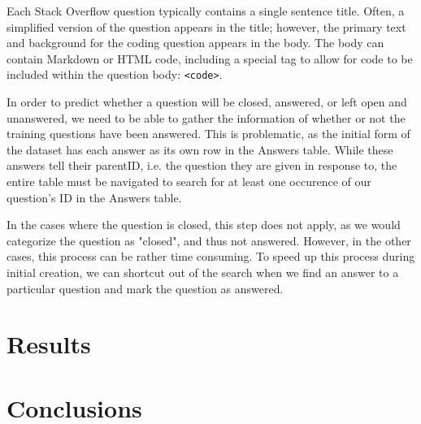 \documentclass{article}
\begin{document}
Each Stack Overflow question typically contains a single sentence title. 
Often, a simplified version of the question appears in the title; however,
the primary text and background for the coding question appears in the body.
The body can contain Markdown or HTML code, including a special tag to allow
for code to be included within the question body: {\tt <code>}. 

In order to predict whether a question will be closed, answered, or left
open and unanswered, we need to be able to gather the information of whether
or not the training questions have been answered. This is problematic, as
the initial form of the dataset has each answer as its own row in the
Answers table. While these answers tell their parentID, i.e. the question
they are given in response to, the entire table must be navigated to search
for at least one occurence of our question's ID in the Answers table.

In the cases where the question is closed, this step does not apply, as we
would categorize the question as "closed", and thus not answered. However,
in the other cases, this process can be rather time consuming. To speed up
this process during initial creation, we can shortcut out of the search when
we find an answer to a particular question and mark the question as
answered.

\section{Results}

\section{Conclusions}

 
\end{document}
